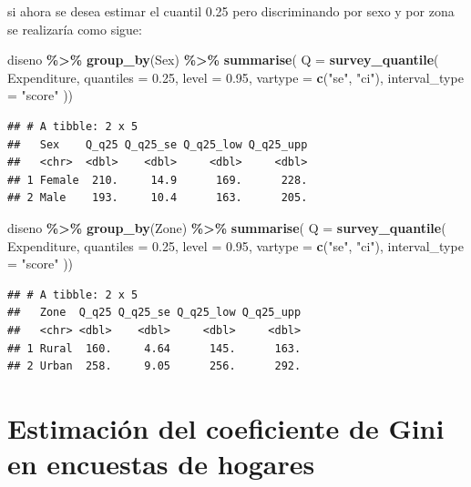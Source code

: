 \documentclass[
  spanish,
  12pt,
]{book}
\newenvironment{Shaded}{\begin{snugshade}}{\end{snugshade}}
\newcommand{\AttributeTok}[1]{\textcolor[rgb]{0.13,0.29,0.53}{#1}}
\newcommand{\FloatTok}[1]{\textcolor[rgb]{0.00,0.00,0.81}{#1}}
\newcommand{\FunctionTok}[1]{\textcolor[rgb]{0.13,0.29,0.53}{\textbf{#1}}}
\newcommand{\NormalTok}[1]{#1}
\newcommand{\SpecialCharTok}[1]{\textcolor[rgb]{0.81,0.36,0.00}{\textbf{#1}}}
\newcommand{\StringTok}[1]{\textcolor[rgb]{0.31,0.60,0.02}{#1}}
\begin{document}
si ahora se desea estimar el cuantil 0.25 pero discriminando por sexo y por zona se realizaría como sigue:

\begin{Shaded}
\begin{Highlighting}[]
\NormalTok{diseno }\SpecialCharTok{\%\textgreater{}\%} \FunctionTok{group\_by}\NormalTok{(Sex) }\SpecialCharTok{\%\textgreater{}\%}
  \FunctionTok{summarise}\NormalTok{(}
    \AttributeTok{Q =}  \FunctionTok{survey\_quantile}\NormalTok{(}
\NormalTok{    Expenditure,}
    \AttributeTok{quantiles =} \FloatTok{0.25}\NormalTok{,}
    \AttributeTok{level =} \FloatTok{0.95}\NormalTok{,}
    \AttributeTok{vartype =}  \FunctionTok{c}\NormalTok{(}\StringTok{"se"}\NormalTok{, }\StringTok{"ci"}\NormalTok{),}
    \AttributeTok{interval\_type =} \StringTok{"score"}
\NormalTok{   ))}
\end{Highlighting}
\end{Shaded}

\begin{verbatim}
## # A tibble: 2 x 5
##   Sex    Q_q25 Q_q25_se Q_q25_low Q_q25_upp
##   <chr>  <dbl>    <dbl>     <dbl>     <dbl>
## 1 Female  210.     14.9      169.      228.
## 2 Male    193.     10.4      163.      205.
\end{verbatim}

\begin{Shaded}
\begin{Highlighting}[]
\NormalTok{diseno }\SpecialCharTok{\%\textgreater{}\%} \FunctionTok{group\_by}\NormalTok{(Zone) }\SpecialCharTok{\%\textgreater{}\%}
  \FunctionTok{summarise}\NormalTok{(}
    \AttributeTok{Q =}  \FunctionTok{survey\_quantile}\NormalTok{(}
\NormalTok{    Expenditure,}
    \AttributeTok{quantiles =} \FloatTok{0.25}\NormalTok{,}
    \AttributeTok{level =} \FloatTok{0.95}\NormalTok{,}
    \AttributeTok{vartype =}  \FunctionTok{c}\NormalTok{(}\StringTok{"se"}\NormalTok{, }\StringTok{"ci"}\NormalTok{),}
    \AttributeTok{interval\_type =} \StringTok{"score"}
\NormalTok{   ))}
\end{Highlighting}
\end{Shaded}

\begin{verbatim}
## # A tibble: 2 x 5
##   Zone  Q_q25 Q_q25_se Q_q25_low Q_q25_upp
##   <chr> <dbl>    <dbl>     <dbl>     <dbl>
## 1 Rural  160.     4.64      145.      163.
## 2 Urban  258.     9.05      256.      292.
\end{verbatim}

\section{Estimación del coeficiente de Gini en encuestas de hogares}\label{estimaciuxf3n-del-coeficiente-de-gini-en-encuestas-de-hogares}
\end{document}
